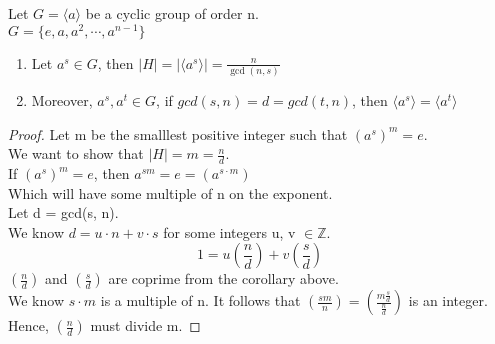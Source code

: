 \begin{theorem}
    Let $G = \langle a \rangle$ be a cyclic group of order n.\\
    $G = \{e, a, a^2, \cdots, a^{n-1}\}$\\
    \begin{enumerate}
        \item Let $a^s \in G$, then $|H| = |\langle a^s \rangle| = \frac{n}{\gcd(n, s)}$\\
        \item Moreover, $a^s, a^t \in G$, if $gcd(s, n) = d = gcd(t, n)$, then $\langle a^s \rangle = \langle a^t \rangle$\\
    \end{enumerate}
\end{theorem}
\begin{proof}
    Let m be the smalllest positive integer such that $(a^s)^m = e$.\\ We want to show that $|H| = m = \frac{n}{d}$.\\
    If $(a^s)^m = e$, then $a^{sm} = e = (a^{s \cdot m})$\\ Which will have some multiple of n on the exponent.\\
    Let d = gcd(s, n).\\
    We know $d = u \cdot n + v \cdot s$ for some integers u, v $\in \mathbb{Z}$.\\
    \[1 = u (\frac{n}{d}) + v (\frac{s}{d})\]
    $(\frac{n}{d})$ and $(\frac{s}{d})$ are coprime from the corollary above.\\
    We know $s \cdot m$ is a multiple of n. It follows that $(\frac{sm}{n}) = (\frac{m \frac{s}{d}}{\frac{n}{d}})$ is an integer.\\
    Hence, $(\frac{n}{d})$ must divide m. 
\end{proof}


